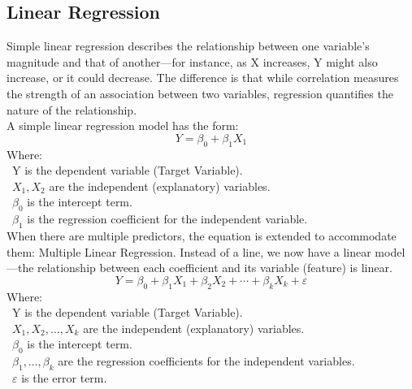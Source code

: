 \documentclass{ieeeojies}
\begin{document}
	\subsection{Linear Regression}
	Simple linear regression describes the relationship between one variable's magnitude and that of another—for instance, as X increases, Y might also increase, or it could decrease. The difference is that while correlation measures the strength of an association between two variables, regression quantifies the nature of the relationship. \cite{b7}\\
	A simple linear regression model has the form:
	\[Y=\beta_0+\beta_1X_1\]
	Where:\\
	\indent\textbullet\ Y is the dependent variable (Target Variable).\\
	\indent\textbullet\ \(X_1, X_2\) are the independent (explanatory) variables.\\
	\indent\textbullet\ \(\beta_0\) is the intercept term.\\
	\indent\textbullet\ \(\beta_1\) is the regression coefficient for the independent variable.\\
	When there are multiple predictors, the equation is extended to accommodate them: Multiple Linear Regression. Instead of a line, we now have a linear model—the relationship between each coefficient and its variable (feature) is linear.
	\[Y=\beta_0+\beta_1 X_1+\beta_2 X_2+\cdots+\beta_k X_k+\varepsilon\]
	Where:\\
	\indent\textbullet\ Y is the dependent variable (Target Variable).\\
	\indent\textbullet\ \(X_1, X_2, \ldots, X_k\) are the independent (explanatory) variables.\\
	\indent\textbullet\ \(\beta_0\) is the intercept term.\\
	\indent\textbullet\ \(\beta_1,..., \beta_k\) are the regression coefficients for the independent variables.\\
	\indent\textbullet\ \(\varepsilon\) is the error term.
	
\end{document}

